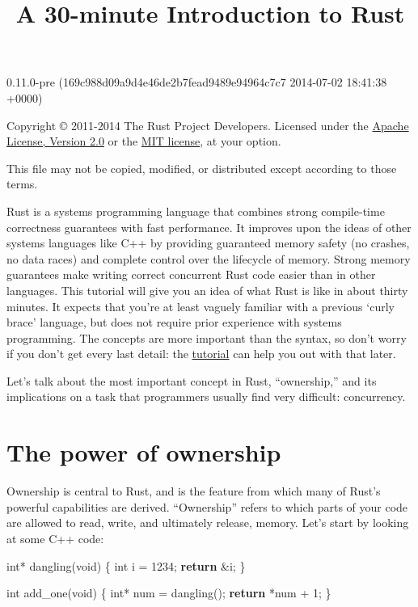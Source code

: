 \documentclass[]{article}
\title{A 30-minute Introduction to Rust}
\newenvironment{Shaded}{}{}
\newcommand{\KeywordTok}[1]{\textcolor[rgb]{0.00,0.44,0.13}{\textbf{{#1}}}}
\newcommand{\DataTypeTok}[1]{\textcolor[rgb]{0.56,0.13,0.00}{{#1}}}
\newcommand{\DecValTok}[1]{\textcolor[rgb]{0.25,0.63,0.44}{{#1}}}
\newcommand{\NormalTok}[1]{{#1}}
\begin{document}
\maketitle

0.11.0-pre (169c988d09a9d4e46de2b7fead9489e94964c7c7 2014-07-02 18:41:38 +0000)

Copyright © 2011-2014 The Rust Project Developers. Licensed under the
\href{http://www.apache.org/licenses/LICENSE-2.0}{Apache License,
Version 2.0} or the \href{http://opensource.org/licenses/MIT}{MIT
license}, at your option.

This file may not be copied, modified, or distributed except according
to those terms.

{
\hypersetup{linkcolor=black}
\setcounter{tocdepth}{3}
\tableofcontents
}
Rust is a systems programming language that combines strong compile-time
correctness guarantees with fast performance. It improves upon the ideas
of other systems languages like C++ by providing guaranteed memory
safety (no crashes, no data races) and complete control over the
lifecycle of memory. Strong memory guarantees make writing correct
concurrent Rust code easier than in other languages. This tutorial will
give you an idea of what Rust is like in about thirty minutes. It
expects that you're at least vaguely familiar with a previous `curly
brace' language, but does not require prior experience with systems
programming. The concepts are more important than the syntax, so don't
worry if you don't get every last detail: the
\href{tutorial.html}{tutorial} can help you out with that later.

Let's talk about the most important concept in Rust, ``ownership,'' and
its implications on a task that programmers usually find very difficult:
concurrency.

\section{The power of ownership}\label{the-power-of-ownership}

Ownership is central to Rust, and is the feature from which many of
Rust's powerful capabilities are derived. ``Ownership'' refers to which
parts of your code are allowed to read, write, and ultimately release,
memory. Let's start by looking at some C++ code:

\begin{Shaded}
\begin{Highlighting}[]
\DataTypeTok{int}\NormalTok{* dangling(}\DataTypeTok{void}\NormalTok{)}
\NormalTok{\{}
    \DataTypeTok{int} \NormalTok{i = }\DecValTok{1234}\NormalTok{;}
    \KeywordTok{return} \NormalTok{&i;}
\NormalTok{\}}

\DataTypeTok{int} \NormalTok{add_one(}\DataTypeTok{void}\NormalTok{)}
\NormalTok{\{}
    \DataTypeTok{int}\NormalTok{* num = dangling();}
    \KeywordTok{return} \NormalTok{*num + }\DecValTok{1}\NormalTok{;}
\NormalTok{\}}
\end{Highlighting}
\end{Shaded}
\end{document}

